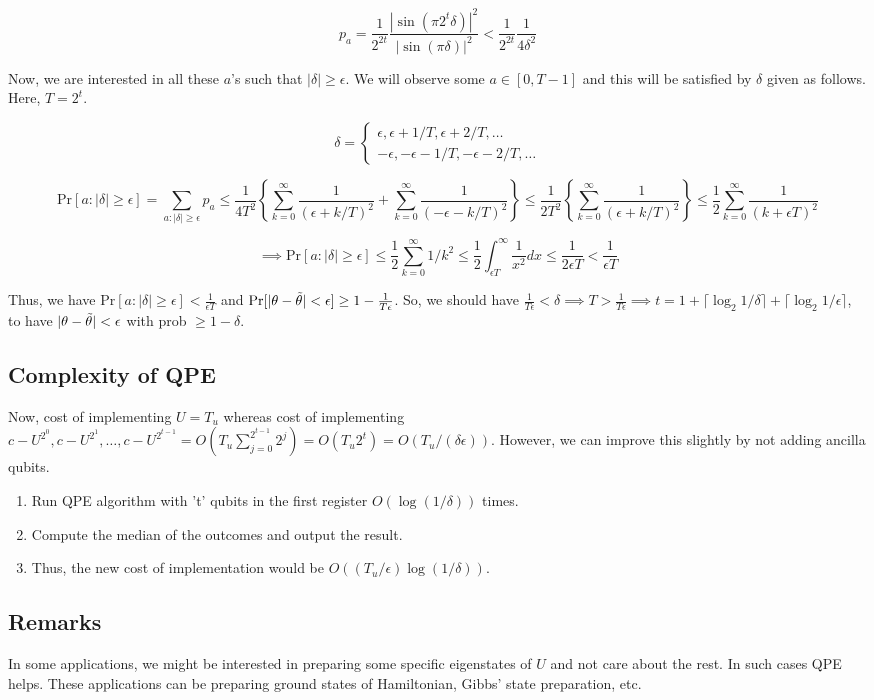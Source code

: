 \documentclass[11.5pt, paper=a4]{article}
\theoremstyle{definition}
\numberwithin{theorem}{section}
\begin{document}
$$p_a = {\frac {1}{2^{2t}}}{\frac {\left|\sin \left(\pi 2^{t}\delta \right)\right|^{2}}{|\sin(\pi \delta )|^{2}}} < {\frac {1}{2^{2t}}}{\frac{1}{4\delta^2}}$$

Now, we are interested in all these $a$'s such that $|\delta| \geq \epsilon$. We will observe some $a \in [0, T - 1]$ and this will be satisfied by $\delta$ given as follows. Here, $T = 2^t$.

$$\delta = \begin{cases}\epsilon, \epsilon + 1/T, \epsilon + 2/T, \ldots\\
- \epsilon, -\epsilon - 1/T, -\epsilon - 2/T, \ldots\end{cases}$$

$$\text{Pr}[a: |\delta| \geq \epsilon] = \sum_{a: |\delta| \geq \epsilon} p_a \leq \frac{1}{4T^2}\left\{\sum_{k = 0}^\infty \frac{1}{\left(\epsilon + k/T\right)^2} + \sum_{k = 0}^\infty \frac{1}{\left(-\epsilon - k/T\right)^2}\right\} \leq \frac{1}{2T^2}\left\{\sum_{k = 0}^\infty \frac{1}{\left(\epsilon + k/T\right)^2}\right\} \leq \frac{1}{2} \sum_{k = 0}^\infty \frac{1}{(k + \epsilon T)^2}$$

$$\implies \text{Pr}[a: |\delta| \geq \epsilon] \leq \frac{1}{2} \sum_{k = 0}^\infty 1/k^2 \leq \frac{1}{2} \int_{\epsilon T}^{\infty} \frac{1}{x^2} dx \leq \frac{1}{2\epsilon T} < \frac{1}{\epsilon T}$$

Thus, we have $\text{Pr}[a: |\delta| \geq \epsilon] < \frac{1}{\epsilon T}$ and $\text{Pr}[|\theta - \Tilde{\theta}| < \epsilon] \geq 1 - \frac{1}{T\epsilon}$. So, we should have $\frac{1}{T\epsilon} < \delta \implies T > \frac{1}{T\epsilon} \implies t = 1 + \lceil \log_2{1/\delta} \rceil + \lceil \log_2{1/\epsilon} \rceil$, to have $|\theta  - \Tilde{\theta}| < \epsilon$ with prob $\geq 1 - \delta$.

\subsection{Complexity of QPE}
Now, cost of implementing $U = T_u$ whereas cost of implementing $c-U^{2^0}, c-U^{2^1}, \ldots, c-U^{2^{t - 1}} = O\left(T_u \sum_{j = 0}^{2^{t - 1}}2^j\right) = O\left(T_u 2^t\right) = O\left({T_u}/({\delta\epsilon})\right)$. However, we can improve this slightly by not adding ancilla qubits.
\begin{enumerate}
    \item Run QPE algorithm with 't' qubits in the first register $O\left(\log(1/\delta)\right)$ times.
    \item Compute the median of the outcomes and output the result.
    \item Thus, the new cost of implementation would be $O\left((T_u/\epsilon) \log(1/\delta)\right)$.
\end{enumerate}
\subsection{Remarks}
In some applications, we might be interested in preparing some specific eigenstates of $U$ and not care about the rest. In such cases QPE helps. These applications can be preparing ground states of Hamiltonian, Gibbs' state preparation, etc.

\nocite{*}


\end{document}
